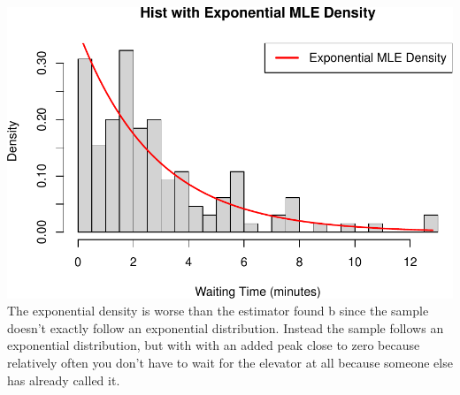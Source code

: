 \documentclass[
]{article}
\begin{document}
\includegraphics{SDA_submission_template_files/figure-latex/unnamed-chunk-5-1.pdf}
The exponential density is worse than the estimator found b since the
sample doesn't exactly follow an exponential distribution. Instead the
sample follows an exponential distribution, but with with an added peak
close to zero because relatively often you don't have to wait for the
elevator at all because someone else has already called it.
\end{document}
